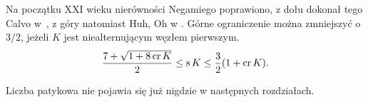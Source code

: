 Na początku XXI wieku nierówności Negamiego poprawiono, z dołu dokonał tego Calvo w~\cite{calvo01}, z góry natomiast Huh, Oh w \cite{huh11}.
%
%
%
Górne ograniczenie można zmniejszyć o $3/2$, jeżeli $K$ jest niealternującym węzłem pierwszym.
\begin{equation}
    \frac{7+\sqrt{1 + 8 \operatorname{cr} K}}{2} \le \operatorname{s} K \le \frac{3}{2} (1 + \operatorname{cr} K).
\end{equation}

Liczba patykowa nie pojawia się już nigdzie w następnych rozdziałach.


%

